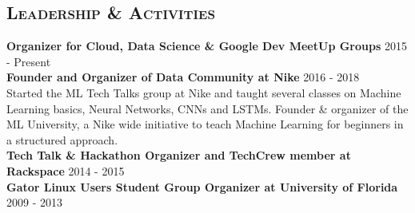 \begin{resume}






\section{\textsc{Leadership \& Activities}}
\textbf{Organizer for Cloud, Data Science \& Google Dev MeetUp Groups} \hfill 2015 - Present\\
\textbf{Founder and Organizer of Data Community at Nike} \hfill 2016 - 2018\\
Started the ML Tech Talks group at Nike and taught several classes on Machine Learning basics, Neural Networks, CNNs and LSTMs. Founder \& organizer of the ML University, a Nike wide initiative to teach Machine Learning for beginners in a structured approach.\\
\textbf{Tech Talk \& Hackathon Organizer and TechCrew member at Rackspace} \hfill 2014 - 2015\\
\textbf{Gator Linux Users Student Group Organizer at University of Florida} \hfill 2009 - 2013\\




\end{resume}

